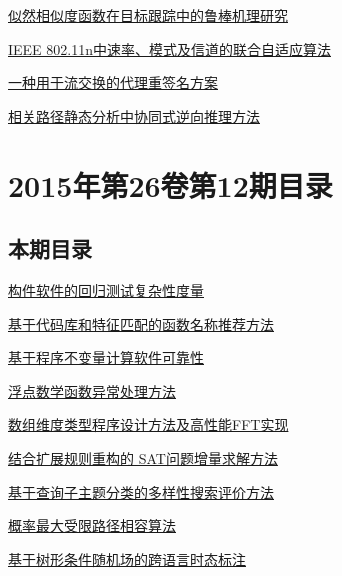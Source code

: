 \documentclass[a4paper]{article}
\begin{document}
\href{http://www.jos.org.cn/ch/reader/download_pdf.aspx?file_no=4619&year_id=2015&quarter_id=1&falg=1}{似然相似度函数在目标跟踪中的鲁棒机理研究}

\href{http://www.jos.org.cn/ch/reader/download_pdf.aspx?file_no=4583&year_id=2015&quarter_id=1&falg=1}{IEEE 802.11n中速率、模式及信道的联合自适应算法}

\href{http://www.jos.org.cn/ch/reader/download_pdf.aspx?file_no=4553&year_id=2015&quarter_id=1&falg=1}{一种用于流交换的代理重签名方案}

\href{http://www.jos.org.cn/ch/reader/download_pdf.aspx?file_no=4658&year_id=2015&quarter_id=1&falg=1}{相关路径静态分析中协同式逆向推理方法}


\section{\textbf{2015年第26卷第12期目录}}
\subsection{本期目录}
\href{http://www.jos.org.cn/ch/reader/download_pdf.aspx?file_no=4876&year_id=2015&quarter_id=12&falg=1}{构件软件的回归测试复杂性度量}

\href{http://www.jos.org.cn/ch/reader/download_pdf.aspx?file_no=4817&year_id=2015&quarter_id=12&falg=1}{基于代码库和特征匹配的函数名称推荐方法}

\href{http://www.jos.org.cn/ch/reader/download_pdf.aspx?file_no=4803&year_id=2015&quarter_id=12&falg=1}{基于程序不变量计算软件可靠性}

\href{http://www.jos.org.cn/ch/reader/download_pdf.aspx?file_no=4814&year_id=2015&quarter_id=12&falg=1}{浮点数学函数异常处理方法}

\href{http://www.jos.org.cn/ch/reader/download_pdf.aspx?file_no=4801&year_id=2015&quarter_id=12&falg=1}{数组维度类型程序设计方法及高性能FFT实现}

\href{http://www.jos.org.cn/ch/reader/download_pdf.aspx?file_no=4827&year_id=2015&quarter_id=12&falg=1}{结合扩展规则重构的 SAT问题增量求解方法}

\href{http://www.jos.org.cn/ch/reader/download_pdf.aspx?file_no=4744&year_id=2015&quarter_id=12&falg=1}{基于查询子主题分类的多样性搜索评价方法}

\href{http://www.jos.org.cn/ch/reader/download_pdf.aspx?file_no=4815&year_id=2015&quarter_id=12&falg=1}{概率最大受限路径相容算法}

\href{http://www.jos.org.cn/ch/reader/download_pdf.aspx?file_no=4816&year_id=2015&quarter_id=12&falg=1}{基于树形条件随机场的跨语言时态标注}
\end{document}
